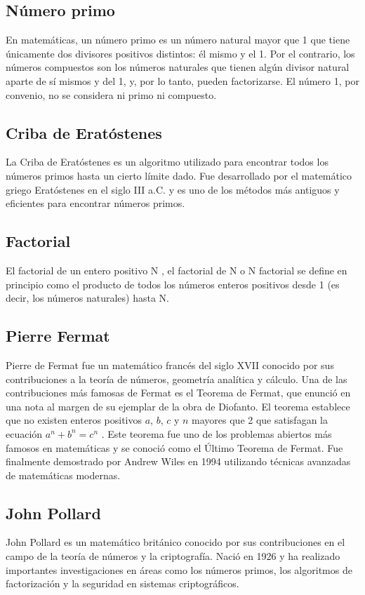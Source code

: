 \subsection{Número primo}
En matemáticas, un número primo es un número natural mayor que 1 que tiene únicamente
dos divisores positivos distintos: él mismo y el 1. Por el contrario, los números compuestos son
los números naturales que tienen algún divisor natural aparte de sí mismos y del 1, y, por lo tanto,
pueden factorizarse. El número 1, por convenio, no se considera ni primo ni compuesto.

\subsection{Criba de Eratóstenes}
La Criba de Eratóstenes es un algoritmo utilizado para encontrar todos los números primos hasta un cierto límite dado. Fue desarrollado por el matemático griego Eratóstenes en el siglo III a.C. y es uno de los métodos más antiguos y eficientes para encontrar números primos.

\subsection{Factorial}
El factorial de un entero positivo N , el factorial de N o N factorial se define en principio como
el producto de todos los números enteros positivos desde 1 (es decir, los números naturales) hasta
N.

\subsection{Pierre Fermat}
Pierre de Fermat fue un matemático francés del siglo XVII conocido por sus contribuciones
a la teoría de números, geometría analítica y cálculo. Una de las contribuciones más famosas de
Fermat es el Teorema de Fermat, que enunció en una nota al margen de su ejemplar de la obra
de Diofanto. El teorema establece que no existen enteros positivos $a$, $b$, $c$ y $n$ mayores que 2 que satisfagan la ecuación $a^n + b^n = c^n$ . Este teorema fue uno de los problemas abiertos más famosos en matemáticas y se conoció como el Último Teorema de Fermat. Fue finalmente demostrado por Andrew Wiles en 1994 utilizando técnicas avanzadas de matemáticas modernas.

\subsection{John Pollard}
John Pollard es un matemático británico conocido por sus contribuciones en el campo de la teoría de números y la criptografía. Nació en 1926 y ha realizado importantes investigaciones en áreas como los números primos, los algoritmos de factorización y la seguridad en sistemas criptográficos.


